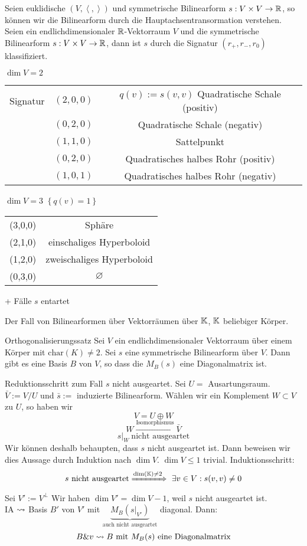 Seien euklidische $(V,\left\langle , \right\rangle )$ und symmetrische Bilinearform $s:V\times V\to\mathbb{R}$, so können wir die Bilinearform durch die Hauptachsentransormation verstehen.
Seien ein endlichdimensionaler $\mathbb{R}$-Vektorraum $V$ und die symmetrische Bilinearform $s:V\times V\to\mathbb{R}$, dann ist $s$ durch die Signatur $(r_+,r_-,r_0)$ klassifiziert.
\begin{Eig}
  $\dim V=2$\\
  \begin{tabular}[htbp]{rcc}
    Signatur & $(2,0,0)$ & $q(v):=s(v,v)$ Quadratische Schale (positiv)\\
    & $(0,2,0)$ & Quadratische Schale (negativ)\\
    & $(1,1,0)$ & Sattelpunkt\\
    & $(0,2,0)$ & Quadratisches halbes Rohr (positiv)\\
    & $(1,0,1)$ & Quadratisches halbes Rohr (negativ)
  \end{tabular}
\end{Eig}
\begin{Eig}
  $\dim V=3$ $\left\{ q(v)=1 \right\}$\\
  \begin{tabular}[htbp]{cc}
    (3,0,0) & Sphäre \\
    (2,1,0) & einschaliges Hyperboloid \\
    (1,2,0) & zweischaliges Hyperboloid \\
    (0,3,0) & $\varnothing$
  \end{tabular}
  + Fälle $s$ entartet
\end{Eig}
Der Fall von Bilinearformen über Vektorräumen über $\mathbb{K}$, $\mathbb{K}$ beliebiger Körper.
\begin{Prop}{Orthogonalisierungssatz}
  Sei $V$ ein endlichdimensionaler Vektorraum über einem Körper mit $\text{char} (K)\neq 2$. Sei $s$ eine symmetrische Bilinearform über $V$. Dann gibt es eine Basis $B$ von $V$, so dass die $M_B(s)$ eine Diagonalmatrix ist.
\end{Prop}
\begin{Bew}
  Reduktionsschritt zum Fall $s$ nicht ausgeartet. Sei $U=$ Ausartungsraum. $\bar V:=V/U$ und $\bar s:=$ induzierte Bilinearform. Wählen wir ein Komplement $W\subset V$ zu $U$, so haben wir
  \[V=U\oplus W\]
  \[W\xrightarrow{\text{Isomorphismus}}\bar V\]
  \[s|_W \ \text{nicht ausgeartet}\]
  Wir können deshalb behaupten, dass $s$ nicht ausgeartet ist. Dann beweisen wir dies Aussage durch Induktion nach $\dim V$. $\dim V\leq 1$ trivial. Induktionsschritt:
  \[s\ \text{nicht ausgeartet} \xRightarrow{\dim (\mathbb{K})\neq 2}\ \exists v\in V: s(v,v)\neq 0\]
  Sei $V':=V^\perp$ Wir haben $\dim V'=\dim V-1$, weil $s$ nicht ausgeartet ist.\\
  IA $\rightsquigarrow$ Basis $B'$ von $V'$ mit $\underbrace{M_B(s|_{V'})}_{\text{auch nicht ausgeartet}}$ diagonal.
  Dann:
  \[B\& v \rightsquigarrow B \text{ mit } M_B(s) \text{ eine Diagonalmatrix}\]
\end{Bew}

